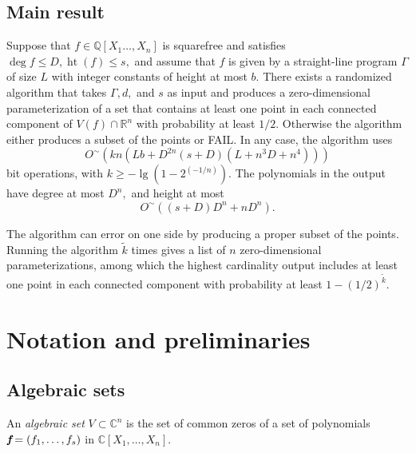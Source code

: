 \documentclass[sigconf]{acmart}
\DeclareMathOperator{\htt}{ht}
\def\C{\mathbb{C}}
\def\Q{\mathbb{Q}}
\def\R{\mathbb{R}}
\def\kt{\widetilde{k}}
\begin{document}
\subsection{Main result}
%
\begin{theorem}
Suppose that $f\in\Q[X_1\hdots,X_n]$ is squarefree and satisfies $\deg f \leq D, \htt(f) \leq s,$ and assume that $f$ is given by a straight-line program $\Gamma$ of size $L$ with integer constants of height at most $b.$ There exists a randomized algorithm that takes $\Gamma, d,$ and $s$ as input and produces a zero-dimensional parameterization of a set that contains at least one point in each connected component of $V(f) \cap \R^n$ with probability at least $1/2$. Otherwise the algorithm either produces a subset of the points or FAIL. In any case, the algorithm uses 
\[
O^{\sim}(kn(Lb+D^{2n}(s+D)(L+n^3D+n^4)))
\]
bit operations, with $k \geq -\lg(1-2^{(-1/n)})$. The polynomials in the output have degree at most $D^n,$ and height at most
\[
O^{\sim}((s+D)D^n + nD^n).
\]
\end{theorem}
%
The algorithm can error on one side by producing a proper subset of the points. Running the algorithm $\kt$ times gives a list of $n$ zero-dimensional parameterizations, among which the highest cardinality output includes at least one point in each connected component with probability at least $1-(1/2)^{\kt}.$
%
%
%
%
\section{Notation and preliminaries}
%
\subsection{Algebraic sets}
%
An \textit{algebraic set} $V \subset \C^n$ is the set of common zeros of a set of polynomials $\textit{\textbf{f}}=(f_1,\hdots,f_s)$ in $\C[X_1,\hdots,X_n].$
\end{document}
